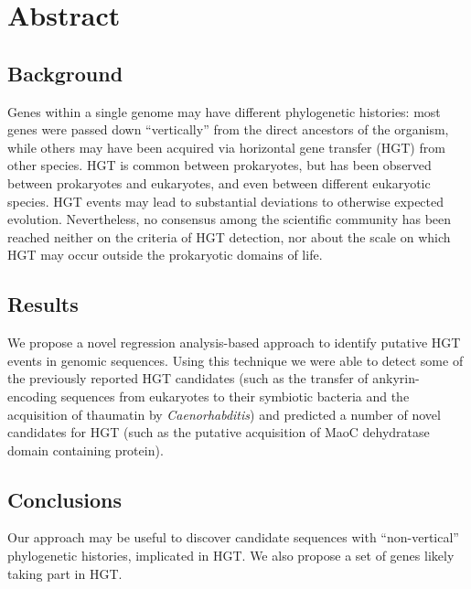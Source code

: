 \section{Abstract}
\label{abstract}

\subsection{Background}
Genes within a single genome may have different phylogenetic histories: most
genes were passed down ``vertically'' from the direct ancestors of the
organism, while others may have been acquired via horizontal gene transfer
(HGT) from other species. HGT is common between prokaryotes, but has been
observed between prokaryotes and eukaryotes, and even between different
eukaryotic species. HGT events may lead to substantial deviations to otherwise
expected evolution.
Nevertheless, no consensus among the scientific community has been reached
neither on the criteria of HGT detection, nor about the scale on which HGT may
occur outside the prokaryotic domains of life.

\subsection{Results}
We propose a novel regression analysis-based approach to identify putative HGT
events in genomic sequences. Using this technique we were able to detect some
of the previously reported HGT candidates (such as the transfer of
ankyrin-encoding sequences from eukaryotes to their symbiotic bacteria
and the acquisition of thaumatin by \textit{Caenorhabditis}) and predicted a
number of novel candidates for HGT (such as the putative acquisition of MaoC
dehydratase domain containing protein).

\subsection{Conclusions}
Our approach may be useful to discover candidate sequences with
``non-vertical'' phylogenetic histories, implicated in HGT. We also propose a
set of genes likely taking part in HGT.
